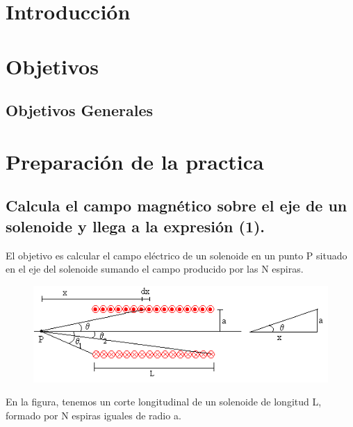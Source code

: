 \documentclass[letterpaper, 12pt]{article}
\begin{document}
\begin{multicols}{2}

\section{Introducción}


\section{Objetivos}

\subsection{Objetivos Generales}


\section{Preparación de la practica}

\subsection*{Calcula el campo magnético sobre el eje de un solenoide y llega a la expresión (1).}

El objetivo es calcular el campo eléctrico de un solenoide en un punto P situado
en el eje del solenoide sumando el campo producido por las N espiras.

\begin{figure}[H]
	\includegraphics[width = \linewidth]{./Images/solenoide.png}
\end{figure}

En la figura, tenemos un corte longitudinal de un solenoide de longitud L,
formado por N espiras iguales de radio a.


\end{multicols}
\end{document}
